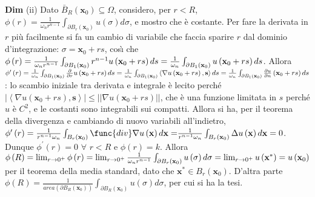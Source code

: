 \documentclass{article}
\begin{document}
\textbf{Dim} (ii) Dato $\bar{B}_{R}\left( \mathbf{x}_{0}\right) \subseteq
\Omega $, considero, per $r<R$, $\phi \left( r\right) =\frac{1}{\omega
_{n}r^{n-1}}\int_{\partial B_{r}\left( \mathbf{x}_{0}\right) }u\left( \sigma
\right) d\sigma $, e mostro che \`{e} costante. Per fare la derivata in $r$
pi\`{u} facilmente si fa un cambio di variabile che faccia sparire $r$ dal
dominio d'integrazione: $\sigma =\mathbf{x}_{0}+rs$, cos\`{\i} che $\phi
\left( r\right) =\frac{1}{\omega _{n}r^{n-1}}\int_{\partial B_{1}\left( 
\mathbf{x}_{0}\right) }r^{n-1}u\left( \mathbf{x}_{0}+rs\right) ds=\frac{1}{%
\omega _{n}}\int_{\partial B_{1}\left( \mathbf{x}_{0}\right) }u\left( 
\mathbf{x}_{0}+rs\right) ds$. Allora $\phi ^{\prime }\left( r\right) =\frac{1%
}{\omega _{n}}\int_{\partial B_{1}\left( \mathbf{x}_{0}\right) }\frac{%
\partial }{\partial r}u\left( \mathbf{x}_{0}+rs\right) ds=\frac{1}{\omega
_{n}}\int_{\partial B_{1}\left( \mathbf{x}_{0}\right) }\left\langle \nabla
u\left( \mathbf{x}_{0}+rs\right) ,\mathbf{s}\right\rangle ds=\frac{1}{\omega
_{n}}\int_{\partial B_{1}\left( \mathbf{x}_{0}\right) }\frac{\partial u}{%
\partial n}\left( \mathbf{x}_{0}+rs\right) ds$: lo scambio iniziale tra
derivata e integrale \`{e} lecito perch\'{e} $\left\vert \left\langle \nabla
u\left( \mathbf{x}_{0}+rs\right) ,\mathbf{s}\right\rangle \right\vert \leq
\left\vert \left\vert \nabla u\left( \mathbf{x}_{0}+rs\right) \right\vert
\right\vert $, che \`{e} una funzione limitata in $s$ perch\'{e} $u$ \`{e} $%
C^{2}$, e le costanti sono integrabili sui compatti. Allora si ha, per il
teorema della divergenza e cambiando di nuovo variabili all'indietro, $\phi
^{\prime }\left( r\right) =\frac{1}{r^{n-1}\omega _{n}}\int_{B_{r}\left( 
\mathbf{x}_{0}\right) }\func{div}\nabla u\left( \mathbf{x}\right) d\mathbf{x=%
}\frac{1}{r^{n-1}\omega _{n}}\int_{B_{r}\left( \mathbf{x}_{0}\right) }\Delta
u\left( \mathbf{x}\right) d\mathbf{x}=0$. Dunque $\phi ^{\prime }\left(
r\right) =0$ $\forall $ $r<R$ e $\phi \left( r\right) =k$. Allora $\phi
\left( R\right) =\lim_{r\rightarrow 0^{+}}\phi \left( r\right)
=\lim_{r\rightarrow 0^{+}}\frac{1}{\omega _{n}r^{n-1}}\int_{\partial
B_{r}\left( \mathbf{x}_{0}\right) }u\left( \sigma \right) d\sigma
=\lim_{r\rightarrow 0^{+}}u\left( \mathbf{x}^{\ast }\right) =u\left( \mathbf{%
x}_{0}\right) $ per il teorema della media standard, dato che $\mathbf{x}%
^{\ast }\in B_{r}\left( \mathbf{x}_{0}\right) $. D'altra parte $\phi \left( R\right) =%
\frac{1}{area\left( \partial B_{R}\left( \mathbf{x}_{0}\right) \right) }%
\int_{\partial B_{R}\left( \mathbf{x}_{0}\right) }u\left( \sigma \right)
d\sigma $, per cui si ha la tesi.
\end{document}
